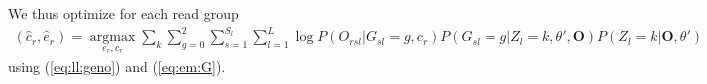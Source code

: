 \documentclass[10pt,a4paper]{article}
\newcommand{\BFO}{\mathbf{O}}
\begin{document}
We thus optimize for each read group
\begin{align}
(\hat{c}_r, \hat{e}_r) = \operatorname*{argmax}_{e_r, c_r}\sum_k\sum_{g=0}^2 \sum_{s=1}^{S_l}\sum_{l=1}^L \log P(O_{rsl} | G_{sl}=g, c_r)  P(G_{sl}=g|Z_l=k, \theta', \BFO) P(Z_l=k | \BFO, \theta')
\end{align}
using (\ref{eq:ll:geno}) and (\ref{eq:em:G}).



\end{document}
